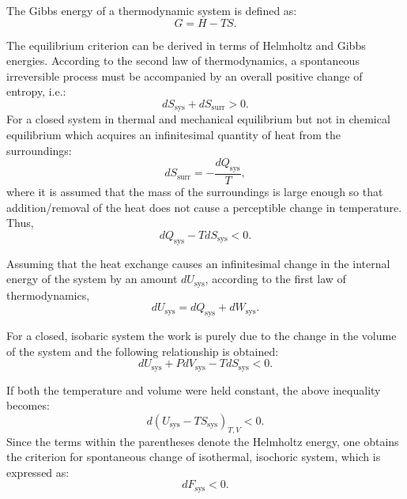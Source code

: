     The Gibbs energy of a thermodynamic system is defined as:
    \begin{equation}
        G = H - TS.
    \end{equation}

    The equilibrium criterion can be derived in terms of Helmholtz and Gibbs energies. According to the second law of thermodynamics, a spontaneous irreversible process must be accompanied by an overall positive change of entropy, i.e.:
    \begin{equation}
        dS_\text{sys} + dS_\text{surr} > 0.
    \end{equation}
    For a closed system in thermal and mechanical equilibrium but not in chemical equilibrium which acquires an infinitesimal quantity of heat from the surroundings:
    \begin{equation}
        dS_\text{surr} = -\frac{dQ_\text{sys}}{T},
    \end{equation}
    where it is assumed that the mass of the surroundings is large enough so that addition/removal of the heat does not cause a perceptible change in temperature. Thus,
    \begin{equation}
        {dQ_\text{sys}} - T dS_\text{sys}  < 0.
    \end{equation}

    Assuming that the heat exchange causes an infinitesimal change in the internal energy of the system by an amount $dU_\text{sys}$, according to the first law of thermodynamics,
    \begin{equation}
        {dU_\text{sys}} = {dQ_\text{sys}} + {dW_\text{sys}}.
    \end{equation}

    For a closed, isobaric system the work is purely due to the change in the volume of the system and the following relationship is obtained:
    \begin{equation}
        {dU_\text{sys}} + P{dV_\text{sys}} - T{dS_\text{sys}} < 0.
    \end{equation}

    If both the temperature and volume were held constant, the above inequality becomes:
    \begin{equation}
        d \left(U_\text{sys} - TS_\text{sys} \right)_{T,V} < 0.
    \end{equation}
    Since the terms within the parentheses denote the Helmholtz energy, one obtains the criterion for spontaneous change of isothermal, isochoric system, which is expressed as:
    \begin{equation}
        d{F_\text{sys} } < 0.
    \end{equation}

